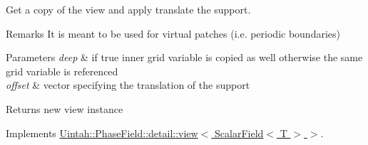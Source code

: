 Get a copy of the view and apply translate the support. 

\begin{DoxyRemark}{Remarks}
It is meant to be used for virtual patches (i.\+e. periodic boundaries)
\end{DoxyRemark}

\begin{DoxyParams}{Parameters}
{\em deep} & if true inner grid variable is copied as well otherwise the same grid variable is referenced \\
\hline
{\em offset} & vector specifying the translation of the support \\
\hline
\end{DoxyParams}
\begin{DoxyReturn}{Returns}
new view instance 
\end{DoxyReturn}


Implements \hyperlink{classUintah_1_1PhaseField_1_1detail_1_1view_3_01ScalarField_3_01T_01_4_01_4_abd928104240e329f3bc4441ebab7c50c}{Uintah\+::\+Phase\+Field\+::detail\+::view$<$ Scalar\+Field$<$ T $>$ $>$}.

\mbox{\label{classUintah_1_1PhaseField_1_1detail_1_1amr__interpolator_3_01ScalarField_3_01T_01_4_00_01Problem64f2458f98b03e27672a091eecc4b696_a9b8a209da971b010bbe33864781d31b2}} 
